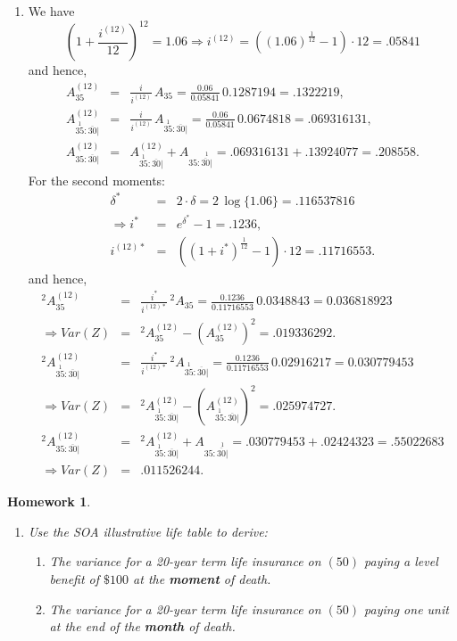 \documentclass[11pt,fleqn,oneside]{book}
\newtheorem{homework}{Homework}
\begin{document}
\begin{enumerate}
\item We have 
$$
\left(1+\frac{i^{(12)}}{12}\right)^{12} = 1.06 \Rightarrow  i^{(12)} = \left(\left(1.06\right)^{\frac{1}{12}} - 1 \right)\cdot 12 = .05841
$$
and hence,
\begin{eqnarray*}
{A_{35}^{(12)}} &=& \frac{i}{i^{(12)}}\, A_{35}= \frac{0.06}{0.05841}\,0.1287194 = .1322219,\\
{A_{\stackrel{1}{35}:\overline{30}|}^{(12)}} &=& \frac{i}{i^{(12)}}\, {A_{\stackrel{1}{35}:\overline{30}|}} = \frac{0.06}{0.05841}\,0.0674818 = .069316131,\\ 
{A_{35:\overline{30}|}^{(12)}} &=& {A_{\stackrel{1}{35}:\overline{30}|}^{(12)}} + {A_{35:\stackrel{1}{\overline{30}|}}} = .069316131 + .13924077 = .208558.
\end{eqnarray*}
For the second moments:
\begin{eqnarray*}
\delta^* &=& 2\cdot \delta = 2\, \log\{1.06\} = .116537816\\
\Rightarrow i^* &=& e^{\delta^*} - 1 = .1236,\\
i^{(12)*} &=& \left(\left(1+ i^*\right)^{\frac{1}{12}} - 1\right) \cdot 12 = .11716553.
\end{eqnarray*}
and hence,
\begin{eqnarray*}
{^2A_{35}^{(12)}} &=& \frac{i^*}{i^{(12)*}}\, {^2A_{35}}= \frac{0.1236}{0.11716553}\,0.0348843 = 0.036818923\\
\Rightarrow Var(Z) &=& {^2A_{35}^{(12)}} - \left({A_{35}^{(12)}}\right)^2 = .019336292.\\
{^2A_{\stackrel{1}{35}:\overline{30}|}^{(12)}} &=& \frac{i^*}{i^{(12)*}}\, {^2A_{\stackrel{1}{35}:\overline{30}|}}= \frac{0.1236}{0.11716553}\,0.02916217 = 0.030779453\\
\Rightarrow Var(Z) &=& {^2A_{\stackrel{1}{35}:\overline{30}|}^{(12)}} - \left({A_{\stackrel{1}{35}:\overline{30}|}^{(12)}}\right)^2 = .025974727.\\
{^2A_{35:\overline{30}|}^{(12)}}&=& {^2A_{\stackrel{1}{35}:\overline{30}|}^{(12)}} + {A_{35:\stackrel{1}{\overline{30}|}}} = .030779453 + .02424323 = .55022683\\
\Rightarrow Var(Z) &=& .011526244.
\end{eqnarray*}
\end{enumerate}
\normalsize

\begin{homework}
\label{HW13}
\begin{enumerate} 
\item Use the SOA illustrative life table to derive:
\begin{enumerate}
\item \label{HW13a} The variance for a 20-year term life insurance on $(50)$ paying a level benefit of $\$100$ at the \textbf{moment} of death.
\item \label{HW13b} The variance for a 20-year term life insurance on $(50)$ paying one unit at the end of the \textbf{month} of death.
\end{enumerate}
\end{enumerate}
\end{homework}
\end{document}
